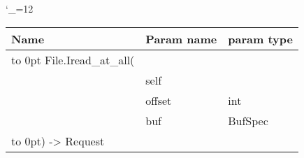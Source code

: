 \begingroup \catcode`\_=12 \tt
\begin{tabular}{lll}
\toprule
\textrm{Name}&\textrm{Param name}&\textrm{param type}\\
\midrule
\hbox to 0pt {File.Iread_at_all(\hss}\\
& self\\
& offset & int\\
& buf & BufSpec\\
\hbox to 0pt{) -> Request\hss}\\
\bottomrule
\end{tabular}
\endgroup
